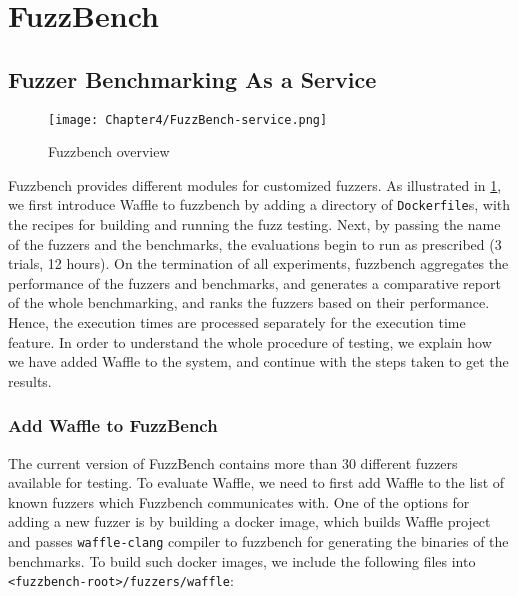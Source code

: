 \section{FuzzBench}
\label{sec:ch4-fuzzbench}


\subsection{Fuzzer Benchmarking As a Service}

 \cite{metzman2020fuzzbench}

\begin{figure}[!t]
    \texttt{[image: Chapter4/FuzzBench-service.png]}
    \centering
    \caption{Fuzzbench overview}
    \label{fig:fuzzbench}
\end{figure}

Fuzzbench provides different modules for customized fuzzers. As illustrated in \ref{fig:fuzzbench}, we first introduce Waffle to fuzzbench by adding a directory of \texttt{Dockerfile}s, with the recipes for building and running the fuzz testing. Next, by passing the name of the fuzzers and the benchmarks, the evaluations begin to run as prescribed (3 trials, 12 hours). On the termination of all experiments, fuzzbench aggregates the performance of the fuzzers and benchmarks, and generates a comparative report of the whole benchmarking, and ranks the fuzzers based on their performance. Hence, the execution times are processed separately for the execution time feature. In order to understand the whole procedure of testing, we explain how we have added Waffle to the system, and continue with the steps taken to get the results.


\subsubsection{Add Waffle to FuzzBench}

\begin{sloppypar}
The current version of FuzzBench contains more than 30 different fuzzers available for testing. To evaluate Waffle, we need to first add Waffle to the list of known fuzzers which Fuzzbench communicates with. One of the options for adding a new fuzzer is by building a docker image, which builds Waffle project and passes \texttt{waffle-clang} compiler to fuzzbench for generating the binaries of the benchmarks. To build such docker images, we include the following files into \texttt{<fuzzbench-root>/fuzzers/waffle}:
\end{sloppypar}

